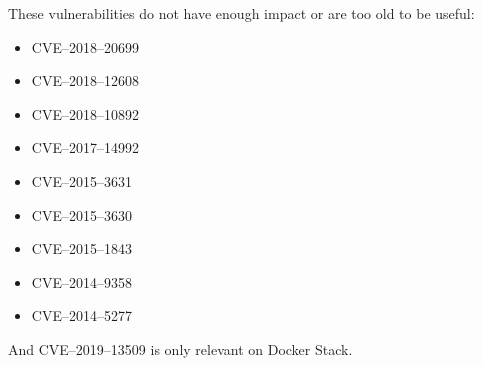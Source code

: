 \hfill

These vulnerabilities do not have enough impact or are too old to be useful:
\begin{itemize}
    \item CVE--2018--20699
    \item CVE--2018--12608
    \item CVE--2018--10892
    \item CVE--2017--14992
    \item CVE--2015--3631
    \item CVE--2015--3630
    \item CVE--2015--1843
    \item CVE--2014--9358
    \item CVE--2014--5277
\end{itemize}

\hfill

And CVE--2019--13509 is only relevant on Docker Stack.
